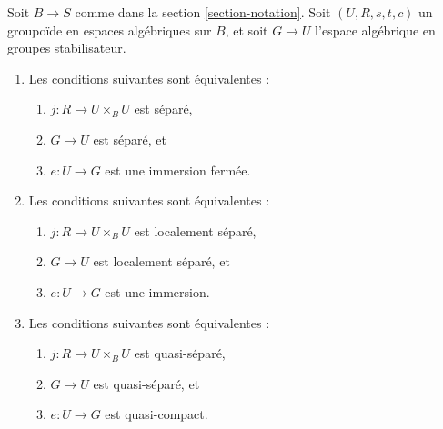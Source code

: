 \begin{lemma}
\label{lemma-diagonal}
Soit $B \to S$ comme dans la section \ref{section-notation}. Soit
$(U, R, s, t, c)$ un groupoïde en espaces algébriques sur $B$, et soit
$G \to U$ l'espace algébrique en groupes stabilisateur.
\begin{enumerate}
\item Les conditions suivantes sont équivalentes :
\begin{enumerate}
\item $j : R \to U \times_B U$ est séparé,
\item $G \to U$ est séparé, et
\item $e : U \to G$ est une immersion fermée.
\end{enumerate}
\item Les conditions suivantes sont équivalentes :
\begin{enumerate}
\item $j : R \to U \times_B U$ est localement séparé,
\item $G \to U$ est localement séparé, et
\item $e : U \to G$ est une immersion.
\end{enumerate}
\item Les conditions suivantes sont équivalentes :
\begin{enumerate}
\item $j : R \to U \times_B U$ est quasi-séparé,
\item $G \to U$ est quasi-séparé, et
\item $e : U \to G$ est quasi-compact.
\end{enumerate}
\end{enumerate}
\end{lemma}

